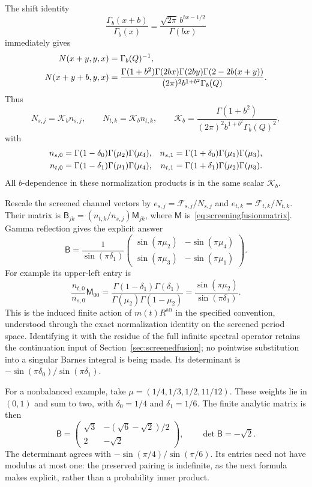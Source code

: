 The shift identity
\[
 \frac{\Gamma_b(x+b)}{\Gamma_b(x)}
       =\frac{\sqrt{2\pi}\,b^{bx-1/2}}{\Gamma(bx)}
\]
immediately gives
\begin{align}
 N(x+y,y,x)&=\Gamma_b(Q)^{-1},\notag\\
 N(x+y+b,y,x)&=
 \frac{\Gamma(1+b^2)\Gamma(2bx)\Gamma(2by)
                 \Gamma(2-2b(x+y))}
      {(2\pi)^2b^{1+b^2}\Gamma_b(Q)}.
 \label{eq:TVscreeningN}
\end{align}
Thus
\[
 N_{s,j}=\mathcal K_b n_{s,j},\qquad
 N_{t,k}=\mathcal K_b n_{t,k},\qquad
 \mathcal K_b=
 \frac{\Gamma(1+b^2)}
      {(2\pi)^2b^{1+b^2}\Gamma_b(Q)^2},
\]
with
\begin{align}
 n_{s,0}&=\Gamma(1-\delta_0)\Gamma(\mu_2)\Gamma(\mu_4),
 &n_{s,1}&=\Gamma(1+\delta_0)\Gamma(\mu_1)\Gamma(\mu_3),
 \notag\\
 n_{t,0}&=\Gamma(1-\delta_1)\Gamma(\mu_1)\Gamma(\mu_4),
 &n_{t,1}&=\Gamma(1+\delta_1)\Gamma(\mu_2)\Gamma(\mu_3).
 \label{eq:TVfiniteN}
\end{align}
All $b$-dependence in these normalization products is in the
same scalar $\mathcal K_b$.

Rescale the screened channel vectors by
$e_{s,j}=\mathcal F_{s,j}/N_{s,j}$ and
$e_{t,k}=\mathcal F_{t,k}/N_{t,k}$. Their matrix is
$\mathsf B_{jk}=(n_{t,k}/n_{s,j})\mathsf M_{jk}$, where
$\mathsf M$ is~\eqref{eq:screeningfusionmatrix}. Gamma reflection
gives the explicit answer
\begin{equation}
 \boxed{\quad
 \mathsf B=
 \frac1{\sin(\pi\delta_1)}
 \begin{pmatrix}
 \sin(\pi\mu_2)&-\sin(\pi\mu_4)\\
 \sin(\pi\mu_3)&-\sin(\pi\mu_1)
 \end{pmatrix}.
 \quad}
 \label{eq:analytic6jscreening}
\end{equation}
For example its upper-left entry is
\[
 \frac{n_{t,0}}{n_{s,0}}\mathsf M_{00}
 =\frac{\Gamma(1-\delta_1)\Gamma(\delta_1)}
        {\Gamma(\mu_2)\Gamma(1-\mu_2)}
 =\frac{\sin(\pi\mu_2)}{\sin(\pi\delta_1)}.
\]
This is the induced finite action of $m(t)R^{\mathrm{an}}$
in the specified convention, understood through the exact
normalization identity on the screened period space. Identifying
it with the residue of the full infinite spectral operator
retains the continuation input of Section~\ref{sec:screenedfusion};
no pointwise substitution into a singular Barnes integral is
being made. Its determinant is
$-\sin(\pi\delta_0)/\sin(\pi\delta_1)$.

For a nonbalanced example, take
$\mu=(1/4,1/3,1/2,11/12)$. These weights lie in $(0,1)$ and
sum to two, with $\delta_0=1/4$ and $\delta_1=1/6$.
The finite analytic matrix is then
\[
 \mathsf B=
 \begin{pmatrix}
 \sqrt3&-(\sqrt6-\sqrt2)/2\\
 2&-\sqrt2
 \end{pmatrix},\qquad \det\mathsf B=-\sqrt2.
\]
The determinant agrees with
$-\sin(\pi/4)/\sin(\pi/6)$. Its entries need not have modulus
at most one: the preserved pairing is indefinite, as the next
formula makes explicit, rather than a probability inner product.

